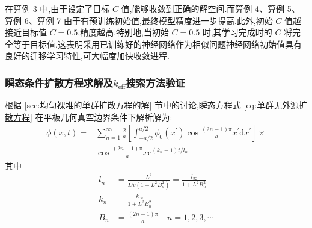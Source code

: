 \documentclass{Sichuan Normal University}
\begin{document}
在算例 3 中,由于设定了目标 $C$ 值,能够收敛到正确的解空间.而算例 4、算例 5、算例 6、算例 7 由于有预训练初始值,最终模型精度进一步提高.此外,初始 $C$ 值越接近目标值 $C=0.5$,精度越高.特别地,当初始 $C=0.5$ 时,其学习完成时的 $C$ 将完全等于目标值.这表明采用已训练好的神经网络作为相似问题神经网络初始值具有良好的迁移学习特性,可大幅度加快收敛进程.

\subsubsection{瞬态条件扩散方程求解及$k_{\text{eff}}$搜索方法验证}

根据 \ref{sec:均匀裸堆的单群扩散方程的解} 节中的讨论,瞬态方程式 \ref{eq:单群无外源扩散方程} 在平板几何真空边界条件下解析解为:
\begin{equation}
\begin{aligned}
\phi(x, t)= & \sum_{n=1}^{\infty} \frac{2}{a}\left[\int_{-a / 2}^{a / 2} \phi_0\left(x^{\prime}\right) \cos \frac{(2 n-1) \pi}{a} x^{\prime} \mathrm{d} x^{\prime}\right] \times \\
& \cos \frac{(2 n-1) \pi}{a} x \mathrm{e}^{\left(k_n-1\right) t / l_n}
\end{aligned}\label{eq:瞬态扩散方程解析解10}
\end{equation}
其中
\begin{align}
l_n&=\frac{L^2}{Dv\left(1+L^2 B_n^2\right)}=\frac{l_{\infty}}{1+L^2 B_n^2}\\
k_n&=\frac{k_{\infty}}{1+L^2 B_n^2}\\
B_n&=\frac{(2 n-1) \pi}{a} \quad n=1,2,3, \cdots
\end{align}
\end{document}
